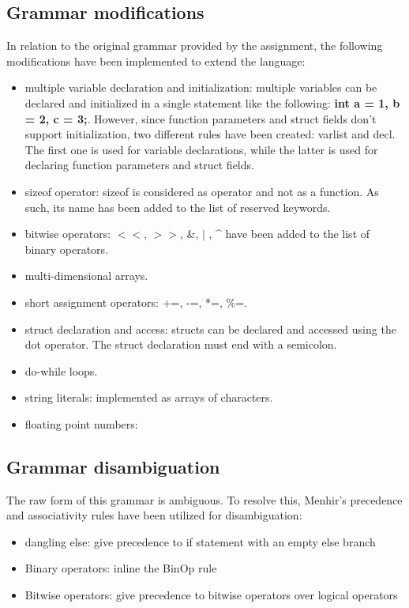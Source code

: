 \documentclass{article}
\begin{document}
\subsection{Grammar modifications}
In relation to the original grammar provided by the assignment, the following modifications
have been implemented to extend the language:
\begin{itemize}
    \item multiple variable declaration and initialization: multiple variables can be declared and initialized in a single statement
    like the following: \textbf{int a = 1, b = 2, c = 3;}. However, since function parameters and struct fields don't support initialization,
    two different rules have been created: varlist and decl. The first one is used for variable declarations,
    while the latter is used for declaring function parameters and struct fields.
    \item sizeof operator: sizeof is considered as operator and not as a function. As such, its name has been added to the list of reserved keywords.
    \item bitwise operators: $<<$, $>>$, \&, $|$ , \^{} have been added to the list of binary operators.
    \item multi-dimensional arrays.
    \item short assignment operators: +=, -=, *=, \%=.
    \item struct declaration and access: structs can be declared and accessed using the dot operator. The struct declaration must end with a semicolon.
    \item do-while loops.
    \item string literals: implemented as arrays of characters.
    \item floating point numbers:
\end{itemize}
\subsection{Grammar disambiguation}
The raw form of this grammar is ambiguous.
To resolve this, Menhir's precedence and associativity rules have been utilized for disambiguation:
\begin{itemize}
  \item dangling else: give precedence to if statement with an empty else branch
  \item Binary operators: inline the BinOp rule
  \item Bitwise operators: give precedence to bitwise operators over logical operators
\end{itemize}
\end{document}
